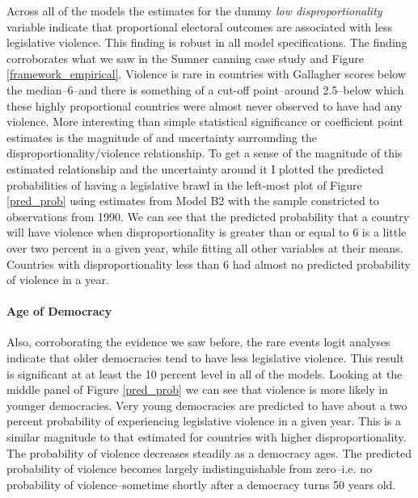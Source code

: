 \documentclass[a4paper]{article}\usepackage[]{graphicx}\usepackage[]{color}
\begin{document}
Across all of the models the estimates for the dummy {\emph{low disproportionality}} variable indicate that proportional electoral outcomes are associated with less legislative violence. This finding is robust in all model specifications. The finding corroborates what we saw in the Sumner canning case study and Figure \ref{framework_empirical}. Violence is rare in countries with Gallagher scores below the median--6--and there is something of a cut-off point--around 2.5--below which these highly proportional countries were almost never observed to have had any violence. More interesting than simple statistical significance or coefficient point estimates is the magnitude of and uncertainty surrounding the disproportionality/violence relationship. To get a sense of the magnitude of this estimated relationship and the uncertainty around it \citep[see][]{King2000} I plotted the predicted probabilities of having a legislative brawl in the left-most plot of Figure \ref{pred_prob} using estimates from Model B2 with the sample constricted to observations from 1990. We can see that the predicted probability that a country will have violence when disproportionality is greater than or equal to 6 is a little over two percent in a given year, while fitting all other variables at their means. Countries with disproportionality less than 6 had almost no predicted probability of violence in a year.

\paragraph{Age of Democracy}

Also, corroborating the evidence we saw before, the rare events logit analyses indicate that older democracies tend to have less legislative violence. This result is significant at at least the 10 percent level in all of the models. Looking at the middle panel of Figure \ref{pred_prob} we can see that violence is more likely in younger democracies. Very young democracies are predicted to have about a two percent probability of experiencing legislative violence in a given year. This is a similar magnitude to that estimated for countries with higher disproportionality. The probability of violence decreases steadily as a democracy ages. The predicted probability of violence becomes largely indistinguishable from zero--i.e. no probability of violence--sometime shortly after a democracy turns 50 years old.
\end{document}
